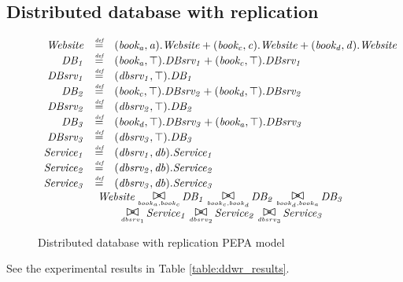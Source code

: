 %
%
\subsection{Distributed database with replication}

\begin{figure}
	\caption{Distributed database with replication PEPA model}
	\label{figure:pepa_ddwr_model}
	\centering
\begin{displaymath}
	\begin{array}{rcl}
		\mathit{Website} & \rmdef & (\mathit{book_a},\mathit{a}).\mathit{Website}+(\mathit{book_c},\mathit{c}).\mathit{Website}+(\mathit{book_d},\mathit{d}).\mathit{Website}\\
		\mathit{DB_1} & \rmdef & (\mathit{book_a},\top).\mathit{DBsrv_1}+(\mathit{book_c},\top).\mathit{DBsrv_1}\\
		\mathit{DBsrv_1} & \rmdef & (\mathit{dbsrv_1},\top).\mathit{DB_1}\\
		\mathit{DB_2} & \rmdef & (\mathit{book_c},\top).\mathit{DBsrv_2}+(\mathit{book_d},\top).\mathit{DBsrv_2}\\
		\mathit{DBsrv_2} & \rmdef & (\mathit{dbsrv_2},\top).\mathit{DB_2}\\
		\mathit{DB_3} & \rmdef & (\mathit{book_d},\top).\mathit{DBsrv_3}+(\mathit{book_a},\top).\mathit{DBsrv_3}\\
		\mathit{DBsrv_3} & \rmdef & (\mathit{dbsrv_3},\top).\mathit{DB_3}\\
		\mathit{Service_1} & \rmdef & (\mathit{dbsrv_1},\mathit{db}).\mathit{Service_1}\\
		\mathit{Service_2} & \rmdef & (\mathit{dbsrv_2},\mathit{db}).\mathit{Service_2}\\
		\mathit{Service_3} & \rmdef & (\mathit{dbsrv_3},\mathit{db}).\mathit{Service_3}\\
[0.0ex]		\multicolumn{3}{c}{\mathit{Website}\sync{book_a,book_c}\mathit{DB_1}\sync{book_c,book_d}\mathit{DB_2}\sync{book_d,book_a}\mathit{DB_3}}\\
[0.0ex]		\multicolumn{3}{c}{\sync{dbsrv_1}\mathit{Service_1}\sync{dbsrv_2}\mathit{Service_2}\sync{dbsrv_3}\mathit{Service_3}}\\
[0.0ex]	\end{array}
\end{displaymath}
\end{figure}

See the experimental results in Table \ref{table:ddwr_results}.

